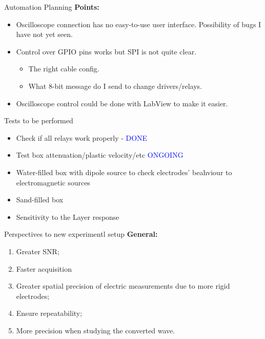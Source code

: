 \documentclass[utf8]{beamer} \usetheme{lfcr} %
\begin{document}
%
\begin{frame}{Automation Planning}
  \textbf{Points:}
  \begin{itemize}
    \item {Oscilloscope connection has no easy-to-use user interface.
      Possibility of bugs I have not yet seen.}
    \item {Control over GPIO pins works but SPI is not quite clear.
      \begin{itemize}
        \item {The right cable config.}
        \item {What 8-bit message do I send to change drivers/relays.}
      \end{itemize}}
    \item {Oscilloscope control could be done with LabView to make it easier.}
  \end{itemize}
\end{frame}
%
\begin{frame}{Tests to be performed}
  \begin{itemize}
    \item Check if all relays work properly - \textcolor{blue}{DONE}
    \item Test box attenuation/plastic velocity/etc \textcolor{blue}{ONGOING}
    \item Water-filled box with dipole source to check electrodes' beahviour to
      electromagnetic sources
    \item Sand-filled box
    \item Sensitivity to the Layer response
  \end{itemize}
\end{frame}
%
\begin{frame}{Perspectives to new experimentl setup}
  \textbf{General:}
  \begin{enumerate}
    \item Greater SNR;
    \item Faster acquisition
    \item Greater spatial precision of electric measurements due to more rigid
      electrodes;
    \item Ensure repeatability;
    \item More precision when studying the converted wave.
  \end{enumerate}
\end{frame}
  
\end{document}
